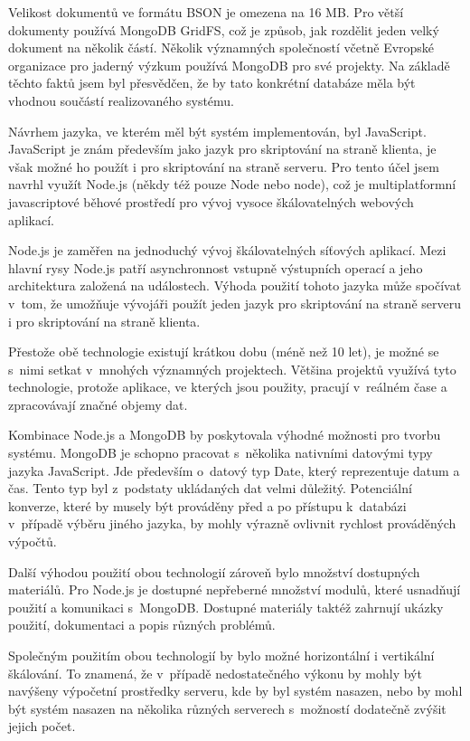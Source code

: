 \documentclass[thesis=M,czech]{FITthesis}[2012/06/26]
\begin{document}
  Velikost dokumentů ve formátu BSON je omezena na 16 MB.
  Pro větší dokumenty používá MongoDB GridFS,
  což je způsob, jak rozdělit jeden velký dokument na několik částí.
  Několik významných společností včetně Evropské organizace pro jaderný výzkum
  používá MongoDB pro své projekty.\cite{nosql}
  Na základě těchto faktů jsem byl přesvědčen, že by tato konkrétní databáze
  měla být vhodnou součástí realizovaného systému.

  Návrhem jazyka, ve kterém měl být systém implementován, byl JavaScript.
  JavaScript je znám především jako jazyk pro skriptování na straně klienta,
  je však možné ho použít i pro skriptování na straně serveru.
  Pro tento účel jsem navrhl využít Node.js (někdy též pouze Node nebo node), což je multiplatformní javascriptové běhové
  prostředí pro vývoj vysoce škálovatelných webových aplikací.
  
  Node.js je zaměřen na jednoduchý vývoj škálovatelných síťových aplikací.
  Mezi hlavní rysy Node.js patří asynchronnost vstupně výstupních operací
  a jeho architektura založená na událostech.
  Výhoda použití tohoto jazyka může spočívat v~tom,
  že umožňuje vývojáři použít jeden jazyk pro skriptování na straně
  serveru i pro skriptování na straně klienta.\cite{nodejs}

  Přestože obě technologie existují krátkou dobu (méně než 10 let),
  je možné se s~nimi setkat v~mnohých významných projektech.
  Většina projektů využívá tyto technologie, protože
  aplikace, ve kterých jsou použity,
  pracují v~reálném čase a zpracovávají značné objemy dat.

  Kombinace Node.js a MongoDB by poskytovala výhodné možnosti pro tvorbu systému.
  MongoDB je schopno pracovat s~několika nativními datovými typy jazyka JavaScript.
  Jde především o~datový typ Date, který reprezentuje datum a čas.
  Tento typ byl z~podstaty ukládaných dat velmi důležitý. 
  Potenciální konverze, které by musely být prováděny před a po přístupu k~databázi
  v~případě výběru jiného jazyka, by mohly výrazně ovlivnit rychlost prováděných výpočtů.
  
  Další výhodou použití obou technologií zároveň bylo množství dostupných materiálů.
  Pro Node.js je dostupné nepřeberné množství modulů,
  které usnadňují použití a komunikaci s~MongoDB.
  Dostupné materiály taktéž zahrnují ukázky použití,
  dokumentaci a popis různých problémů.
  
  Společným použitím obou technologií by bylo možné horizontální i vertikální škálování.
  To znamená, že v~případě nedostatečného výkonu
  by mohly být navýšeny výpočetní prostředky serveru,
  kde by byl systém nasazen, 
  nebo by mohl být systém nasazen na několika různých serverech s~možností dodatečně zvýšit jejich počet.
  
\end{document}
